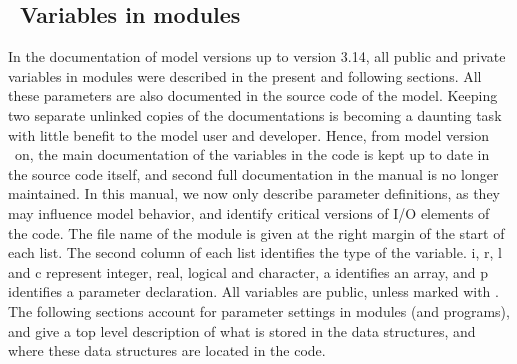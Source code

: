 \vsssub
\subsection{~Variables in modules} \label{sec:variables}
\vsssub

\noindent 
In the documentation of model versions up to version 3.14, all {\F public} and
{\F private} variables in modules were described in the present and following
sections. All these parameters are also documented in the source code of the
model. Keeping two separate unlinked copies of the documentations is becoming
a daunting task with little benefit to the model user and developer. Hence,
from model version \WWver\ on, the main documentation of the variables in the
code is kept up to date in the source code itself, and second full
documentation in the manual is no longer maintained. In this manual, we now
only describe {\F parameter} definitions, as they may influence model
behavior, and identify critical versions of I/O elements of the code.  The
file name of the module is given at the right margin of the start of each
list. The second column of each list identifies the type of the variable. {\F
i}, {\F r}, {\F l} and {\F c} represent integer, real, logical and character,
{\F a} identifies an array, and{ \F p} identifies a {\F parameter}
declaration. All variables are public, unless marked with \opt.  The following
sections account for parameter settings in modules (and programs), and give a
top level description of what is stored in the data structures, and where
these data structures are located in the code.